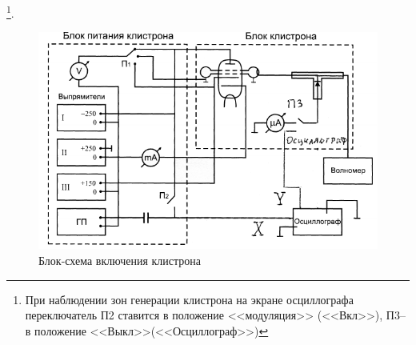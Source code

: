 \footnote{При наблюдении зон генерации клистрона на экране осциллографа переключатель П2 ставится  в положение <<модуляция>> (<<Вкл>>), П3--в положение <<Выкл>>(<<Осциллограф>>)}.

\begin{figure}[h!]
	\centering
	\includegraphics[width=\textwidth]{fig/fig4}
	\caption{ Блок-схема включения клистрона}
	\label{fig:4}
\end{figure}

